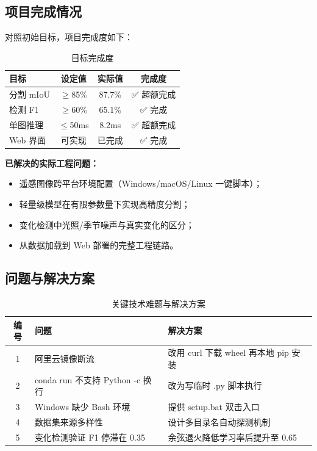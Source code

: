 \documentclass[12pt,a4paper]{article}
\begin{document}
\subsection{项目完成情况}

对照初始目标，项目完成度如下：

\begin{table}[H]
\centering
\caption{目标完成度}
\label{tab:goal}
\begin{tabular}{lccc}
\toprule
目标 & 设定值 & 实际值 & 完成度 \\
\midrule
分割 mIoU & $\geq$85\% & 87.7\% & ✅ 超额完成 \\
检测 F1 & $\geq$60\% & 65.1\% & ✅ 完成 \\
单图推理 & $\leq$50ms & 8.2ms & ✅ 超额完成 \\
Web 界面 & 可实现 & 已完成 & ✅ 完成 \\
\bottomrule
\end{tabular}
\end{table}

\textbf{已解决的实际工程问题：}
\begin{itemize}
    \item 遥感图像跨平台环境配置（Windows/macOS/Linux 一键脚本）；
    \item 轻量级模型在有限参数量下实现高精度分割；
    \item 变化检测中光照/季节噪声与真实变化的区分；
    \item 从数据加载到 Web 部署的完整工程链路。
\end{itemize}

\subsection{问题与解决方案}

\begin{table}[H]
\centering
\caption{关键技术难题与解决方案}
\label{tab:issues}
\begin{tabular}{cll}
\toprule
编号 & 问题 & 解决方案 \\
\midrule
1 & 阿里云镜像断流 & 改用 curl 下载 wheel 再本地 pip 安装 \\
2 & conda run 不支持 Python -c 换行 & 改为写临时 .py 脚本执行 \\
3 & Windows 缺少 Bash 环境 & 提供 setup.bat 双击入口 \\
4 & 数据集来源多样性 & 设计多目录名自动探测机制 \\
5 & 变化检测验证 F1 停滞在 0.35 & 余弦退火降低学习率后提升至 0.65 \\
\bottomrule
\end{tabular}
\end{table}
\end{document}
